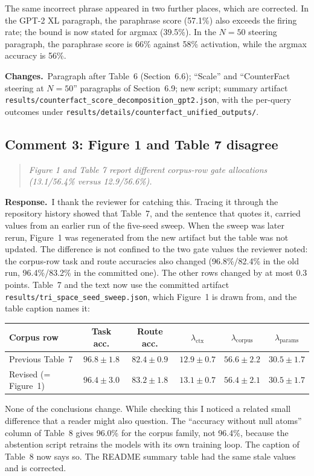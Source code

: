 \documentclass[11pt]{article}
\newenvironment{reviewer}{\par\medskip\noindent\begin{quote}\itshape}{\end{quote}}
\newcommand{\response}{\par\noindent\textbf{Response.}\ }
\newcommand{\changes}{\par\smallskip\noindent\textbf{Changes.}\ }
\begin{document}
The same incorrect phrase appeared in two further places, which are corrected. In the GPT-2 XL paragraph, the paraphrase score (57.1\%) also exceeds the firing rate; the bound is now stated for argmax (39.5\%). In the $N=50$ steering paragraph, the paraphrase score is 66\% against 58\% activation, while the argmax accuracy is 56\%.

\changes Paragraph after Table~6 (Section~6.6); ``Scale'' and ``CounterFact steering at $N=50$'' paragraphs of Section~6.9; new script; summary artifact \nolinkurl{results/counterfact_score_decomposition_gpt2.json}, with the per-query outcomes under \nolinkurl{results/details/counterfact_unified_outputs/}.

\subsection*{Comment 3: Figure 1 and Table 7 disagree}

\begin{reviewer}
Figure 1 and Table 7 report different corpus-row gate allocations (13.1/56.4\% versus 12.9/56.6\%).
\end{reviewer}

\response I thank the reviewer for catching this. Tracing it through the repository history showed that Table~7, and the sentence that quotes it, carried values from an earlier run of the five-seed sweep. When the sweep was later rerun, Figure~1 was regenerated from the new artifact but the table was not updated. The difference is not confined to the two gate values the reviewer noted: the corpus-row task and route accuracies also changed (96.8\%/82.4\% in the old run, 96.4\%/83.2\% in the committed one). The other rows changed by at most 0.3 points. Table~7 and the text now use the committed artifact \nolinkurl{results/tri_space_seed_sweep.json}, which Figure~1 is drawn from, and the table caption names it:
\begin{center}
\begin{tabular}{@{}lccccc@{}}
\toprule
Corpus row & Task acc. & Route acc. & $\lambda_{\mathrm{ctx}}$ & $\lambda_{\mathrm{corpus}}$ & $\lambda_{\mathrm{params}}$ \\
\midrule
Previous Table~7 & $96.8\pm1.8$ & $82.4\pm0.9$ & $12.9\pm0.7$ & $56.6\pm2.2$ & $30.5\pm1.7$ \\
Revised (= Figure~1) & $96.4\pm3.0$ & $83.2\pm1.8$ & $13.1\pm0.7$ & $56.4\pm2.1$ & $30.5\pm1.7$ \\
\bottomrule
\end{tabular}
\end{center}
None of the conclusions change. While checking this I noticed a related small difference that a reader might also question. The ``accuracy without null atoms'' column of Table~8 gives 96.0\% for the corpus family, not 96.4\%, because the abstention script retrains the models with its own training loop. The caption of Table~8 now says so. The README summary table had the same stale values and is corrected.
\end{document}
